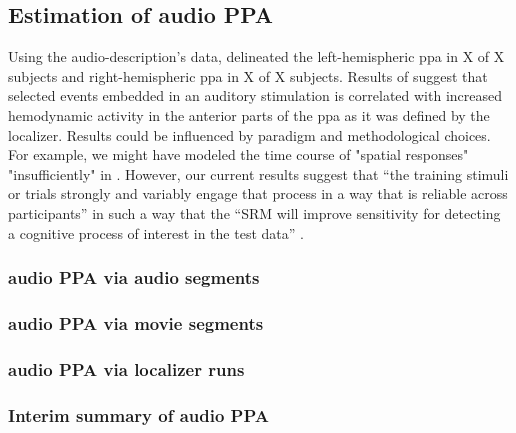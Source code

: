 \subsection{Estimation of audio PPA}


Using the audio-description's data, \citet{haeusler2022processing} delineated
the left-hemispheric \ac{ppa} in X of X subjects and right-hemispheric \ac{ppa}
in X of X subjects.
%
Results of \citet{haeusler2022processing} suggest that selected events embedded
in an auditory stimulation is correlated with increased hemodynamic activity in
the anterior parts of the \ac{ppa} as it was defined by the localizer.
%
Results could be influenced by paradigm and methodological choices.
%
For example, we might have modeled the time course of "spatial responses"
"insufficiently" in \citep{haeusler2022processing}.
%
However, our current results suggest that ``the training stimuli or trials
strongly and variably engage that process in a way that is reliable across
participants'' in such a way that the ``SRM will improve sensitivity for
detecting a cognitive process of interest in the test data''
\citep{cohen2017computational}.


\subsubsection{audio PPA via audio segments}

\subsubsection{audio PPA via movie segments}

\subsubsection{audio PPA via localizer runs}

\subsubsection{Interim summary of audio PPA}

